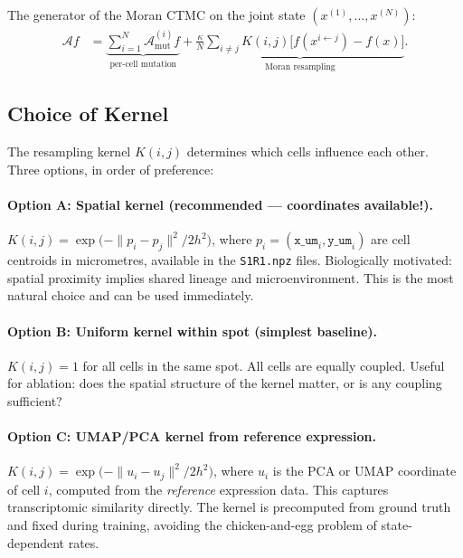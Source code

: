 \documentclass[11pt]{article}
\begin{document}
The generator of the Moran CTMC on the joint state $(x^{(1)}, \ldots, x^{(N)})$:
\begin{align}
  \mathcal{A}f &= \underbrace{\sum_{i=1}^N \mathcal{A}_{\text{mut}}^{(i)} f}_{\text{per-cell mutation}} + \underbrace{\frac{\kappa}{N} \sum_{i \neq j} K(i,j) \bigl[f(x^{i \leftarrow j}) - f(x)\bigr]}_{\text{Moran resampling}}.
\end{align}

\subsection{Choice of Kernel}

The resampling kernel $K(i,j)$ determines which cells influence each other. Three options, in order of preference:

\paragraph{Option A: Spatial kernel (recommended --- coordinates available!).}
$K(i, j) = \exp\!\bigl(-\|p_i - p_j\|^2 / 2h^2\bigr)$,
where $p_i = (\texttt{x\_um}_i, \texttt{y\_um}_i)$ are cell centroids in micrometres, available in the \texttt{S1R1.npz} files. Biologically motivated: spatial proximity implies shared lineage and microenvironment. This is the most natural choice and can be used immediately.

\paragraph{Option B: Uniform kernel within spot (simplest baseline).}
$K(i,j) = 1$ for all cells in the same spot. All cells are equally coupled. Useful for ablation: does the spatial structure of the kernel matter, or is any coupling sufficient?

\paragraph{Option C: UMAP/PCA kernel from reference expression.}
$K(i,j) = \exp\!\bigl(-\|u_i - u_j\|^2 / 2h^2\bigr)$,
where $u_i$ is the PCA or UMAP coordinate of cell $i$, computed from the \emph{reference} expression data. This captures transcriptomic similarity directly. The kernel is precomputed from ground truth and fixed during training, avoiding the chicken-and-egg problem of state-dependent rates.
\end{document}
